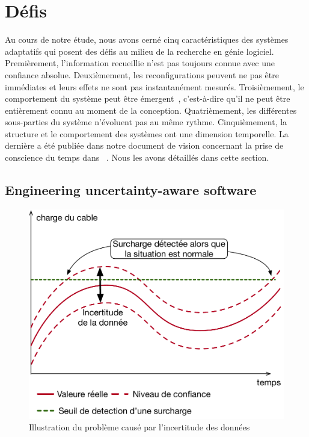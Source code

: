 \section{Défis}

%
Au cours de notre étude, nous avons cerné cinq caractéristiques des systèmes adaptatifs qui posent des défis au milieu de la recherche en génie logiciel. 
Premièrement, l'information recueillie n'est pas toujours connue avec une confiance absolue. 
Deuxièmement, les reconfigurations peuvent ne pas être immédiates et leurs effets ne sont pas instantanément mesurés. Troisièmement, le comportement du système peut être émergent~\cite{zio2011uncertainties}, c'est-à-dire qu'il ne peut être entièrement connu au moment de la conception. 
Quatrièmement, les différentes sous-parties du système n'évoluent pas au même rythme. 
Cinquièmement, la structure et le comportement des systèmes ont une dimension temporelle. 
La dernière a été publiée dans notre document de vision concernant la prise de conscience du temps dans ~\cite{DBLP:conf/models/Benelallam0MFBB17}. 
Nous les avons détaillés dans cette section.

\subsection{Engineering uncertainty-aware software}
\label{sec:french:challenges:duc}

\begin{figure}
	\centering
	\includegraphics[width=.6\linewidth]{img/apdx-french/challenges/duc}
	\caption{Illustration du problème causé par l'incertitude des données}
	\label{fig:french:chal:duc}
\end{figure}


